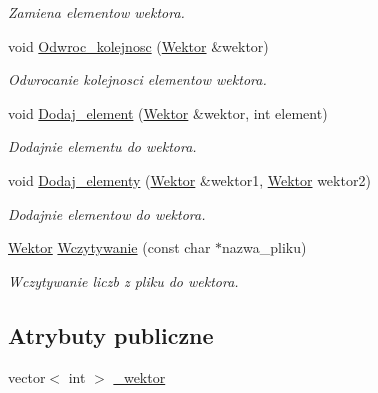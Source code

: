 \begin{DoxyCompactItemize}
\begin{DoxyCompactList}\small\item\em \-Zamiena elementow wektora. \end{DoxyCompactList}\item 
void \hyperlink{class_wektor_a8fe8be584e5c5b4ef6d2675e2ee8a850}{\-Odwroc\-\_\-kolejnosc} (\hyperlink{class_wektor}{\-Wektor} \&wektor)
\begin{DoxyCompactList}\small\item\em \-Odwrocanie kolejnosci elementow wektora. \end{DoxyCompactList}\item 
void \hyperlink{class_wektor_a9fcbf22af29bae4c4ed58f7ae63f6a85}{\-Dodaj\-\_\-element} (\hyperlink{class_wektor}{\-Wektor} \&wektor, int element)
\begin{DoxyCompactList}\small\item\em \-Dodajnie elementu do wektora. \end{DoxyCompactList}\item 
void \hyperlink{class_wektor_adb5f102857b842598c2f6ecbc7fd890c}{\-Dodaj\-\_\-elementy} (\hyperlink{class_wektor}{\-Wektor} \&wektor1, \hyperlink{class_wektor}{\-Wektor} wektor2)
\begin{DoxyCompactList}\small\item\em \-Dodajnie elementow do wektora. \end{DoxyCompactList}\item 
\hyperlink{class_wektor}{\-Wektor} \hyperlink{class_wektor_ab92e4e4bded170a49ebfd48be164b91c}{\-Wczytywanie} (const char $\ast$nazwa\-\_\-pliku)
\begin{DoxyCompactList}\small\item\em \-Wczytywanie liczb z pliku do wektora. \end{DoxyCompactList}\end{DoxyCompactItemize}
\subsection*{\-Atrybuty publiczne}
\begin{DoxyCompactItemize}
\item 
vector$<$ int $>$ \hyperlink{class_wektor_a7f12c52f70d750eca2185d5d744f82e0}{\-\_\-wektor}
\end{DoxyCompactItemize}
